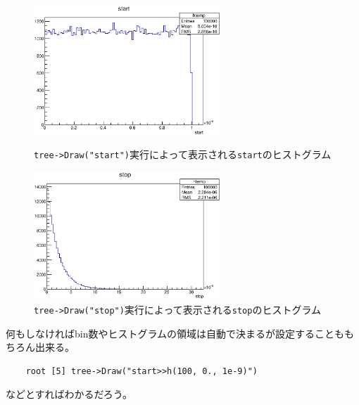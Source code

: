 \documentclass{jarticle}
\begin{document}
\begin{figure}[htbp]
 \begin{minipage}{0.45\hsize}
  \begin{center}
   \includegraphics[width = 70mm]{./picture/meettreecanvas1.eps}
  \end{center}
  \caption{\texttt{tree->Draw("start")}実行によって表示される\texttt{start}のヒストグラム}
  \label{Fig:meettreecanvas1}
 \end{minipage}
 \begin{minipage}{0.45\hsize}
  \begin{center}
   \includegraphics[width = 70mm]{./picture/meettreecanvas2.eps}
  \end{center}
  \caption{\texttt{tree->Draw("stop")}実行によって表示される\texttt{stop}のヒストグラム}
  \label{Fig:meettreecanvas2}
 \end{minipage}
\end{figure}


何もしなければbin数やヒストグラムの領域は自動で決まるが設定することももちろん出来る。
\begin{verbatim}
	root [5] tree->Draw("start>>h(100, 0., 1e-9)")
\end{verbatim}
などとすればわかるだろう。
\end{document}
